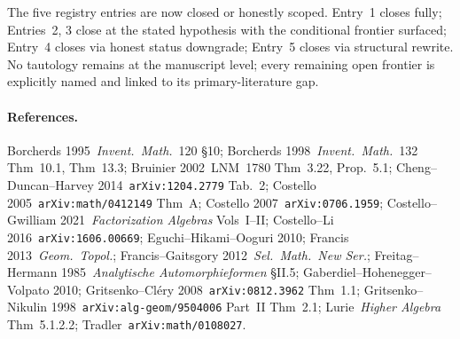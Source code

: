 The five registry entries are now closed or honestly scoped.  Entry~1
closes fully; Entries~2, 3 close at the stated hypothesis with the
conditional frontier surfaced; Entry~4 closes via honest status
downgrade; Entry~5 closes via structural rewrite.  No tautology
remains at the manuscript level; every remaining open frontier is
explicitly named and linked to its primary-literature gap.

\paragraph{References.}
Borcherds 1995~\emph{Invent.~Math.}~120 \S10;
Borcherds 1998~\emph{Invent.~Math.}~132 Thm~10.1, Thm~13.3;
Bruinier 2002~LNM~1780 Thm~3.22, Prop.~5.1;
Cheng--Duncan--Harvey 2014~\texttt{arXiv:1204.2779} Tab.~2;
Costello 2005~\texttt{arXiv:math/0412149} Thm~A;
Costello 2007~\texttt{arXiv:0706.1959};
Costello--Gwilliam 2021~\emph{Factorization Algebras} Vols~I--II;
Costello--Li 2016~\texttt{arXiv:1606.00669};
Eguchi--Hikami--Ooguri 2010;
Francis 2013~\emph{Geom.~Topol.};
Francis--Gaitsgory 2012~\emph{Sel.~Math.~New Ser.};
Freitag--Hermann 1985~\emph{Analytische Automorphieformen} \S II.5;
Gaberdiel--Hohenegger--Volpato 2010;
Gritsenko--Cl\'ery 2008~\texttt{arXiv:0812.3962} Thm~1.1;
Gritsenko--Nikulin 1998~\texttt{arXiv:alg-geom/9504006} Part~II Thm~2.1;
Lurie~\emph{Higher Algebra} Thm~5.1.2.2;
Tradler~\texttt{arXiv:math/0108027}.
